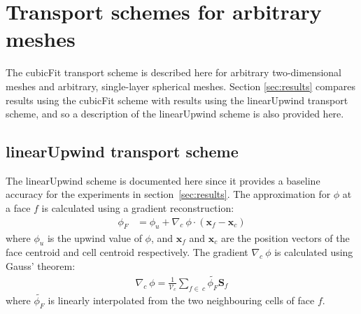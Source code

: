 \section{Transport schemes for arbitrary meshes}
The cubicFit transport scheme is described here for arbitrary two-dimensional meshes and arbitrary, single-layer spherical meshes.  Section \ref{sec:results} compares results using the cubicFit scheme with results using the linearUpwind transport scheme, and so a description of the linearUpwind scheme is also provided here.





\subsection{linearUpwind transport scheme}
The linearUpwind scheme is documented here since it provides a baseline accuracy for the experiments in section~\ref{sec:results}.  The approximation for $\phi$ at a face $f$ is calculated using a gradient reconstruction:
\begin{align}
	\phi_F &= \phi_u + \nabla_c\: \phi \cdot \left(\mathbf{x}_f - \mathbf{x}_c \right)
\end{align} 
where $\phi_u$ is the upwind value of $\phi$, and $\mathbf{x}_f$ and $\mathbf{x}_c$ are the position vectors of the face centroid and cell centroid respectively.   The gradient $\nabla_c \:\phi$ is calculated using Gauss' theorem:
\begin{align}
	\nabla_c\: \phi = \frac{1}{\mathcal{V}_c} \sum_{f\in\:c} \tilde{\phi_F} \mathbf{S}_f
\end{align}
where $\tilde{\phi_F}$ is linearly interpolated from the two neighbouring cells of face $f$.


